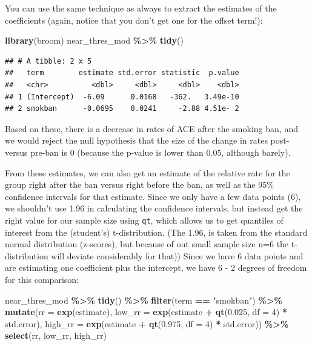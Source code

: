 \documentclass[
]{book}
\newenvironment{Shaded}{\begin{snugshade}}{\end{snugshade}}
\newcommand{\AttributeTok}[1]{\textcolor[rgb]{0.13,0.29,0.53}{#1}}
\newcommand{\DecValTok}[1]{\textcolor[rgb]{0.00,0.00,0.81}{#1}}
\newcommand{\FloatTok}[1]{\textcolor[rgb]{0.00,0.00,0.81}{#1}}
\newcommand{\FunctionTok}[1]{\textcolor[rgb]{0.13,0.29,0.53}{\textbf{#1}}}
\newcommand{\NormalTok}[1]{#1}
\newcommand{\SpecialCharTok}[1]{\textcolor[rgb]{0.81,0.36,0.00}{\textbf{#1}}}
\newcommand{\StringTok}[1]{\textcolor[rgb]{0.31,0.60,0.02}{#1}}
\begin{document}
You can use the same technique as always to extract the estimates of the coefficients (again, notice that you don't get one for the offset term!):

\begin{Shaded}
\begin{Highlighting}[]
\FunctionTok{library}\NormalTok{(broom)}
\NormalTok{near\_thres\_mod }\SpecialCharTok{\%\textgreater{}\%} 
  \FunctionTok{tidy}\NormalTok{()}
\end{Highlighting}
\end{Shaded}

\begin{verbatim}
## # A tibble: 2 x 5
##   term        estimate std.error statistic  p.value
##   <chr>          <dbl>     <dbl>     <dbl>    <dbl>
## 1 (Intercept)  -6.09      0.0168   -362.   3.49e-10
## 2 smokban      -0.0695    0.0241     -2.88 4.51e- 2
\end{verbatim}

Based on these, there is a decrease in rates of ACE after the smoking ban, and we would reject the null hypothesis that the size of the change in rates post- versus pre-ban is 0 (because the p-value is lower than 0.05, although barely).

From these estimates, we can also get an estimate of the relative rate for the
group right after the ban versus right before the ban, as well as the 95\% confidence intervals for that estimate. Since we only have a few data points (6), we shouldn't use 1.96 in calculating the confidence intervals, but instead get the right value for our sample size using \texttt{qt}, which allows us to get quantiles of interest from the (student's) t-distribution. (The 1.96, is taken from the standard normal distribution (z-scores), but because of out small sample size n=6 the t-distribution will deviate considerably for that)) Since we have 6 data points and are estimating one coefficient plus the intercept, we have 6 - 2 degrees of freedom for this comparison:

\begin{Shaded}
\begin{Highlighting}[]
\NormalTok{near\_thres\_mod }\SpecialCharTok{\%\textgreater{}\%} 
  \FunctionTok{tidy}\NormalTok{() }\SpecialCharTok{\%\textgreater{}\%} 
  \FunctionTok{filter}\NormalTok{(term }\SpecialCharTok{==} \StringTok{"smokban"}\NormalTok{) }\SpecialCharTok{\%\textgreater{}\%} 
  \FunctionTok{mutate}\NormalTok{(}\AttributeTok{rr =} \FunctionTok{exp}\NormalTok{(estimate), }
         \AttributeTok{low\_rr =} \FunctionTok{exp}\NormalTok{(estimate }\SpecialCharTok{+} \FunctionTok{qt}\NormalTok{(}\FloatTok{0.025}\NormalTok{, }\AttributeTok{df =} \DecValTok{4}\NormalTok{) }\SpecialCharTok{*}\NormalTok{ std.error), }
         \AttributeTok{high\_rr =} \FunctionTok{exp}\NormalTok{(estimate }\SpecialCharTok{+} \FunctionTok{qt}\NormalTok{(}\FloatTok{0.975}\NormalTok{, }\AttributeTok{df =} \DecValTok{4}\NormalTok{) }\SpecialCharTok{*}\NormalTok{ std.error)) }\SpecialCharTok{\%\textgreater{}\%} 
  \FunctionTok{select}\NormalTok{(rr, low\_rr, high\_rr)}
\end{Highlighting}
\end{Shaded}
\end{document}
